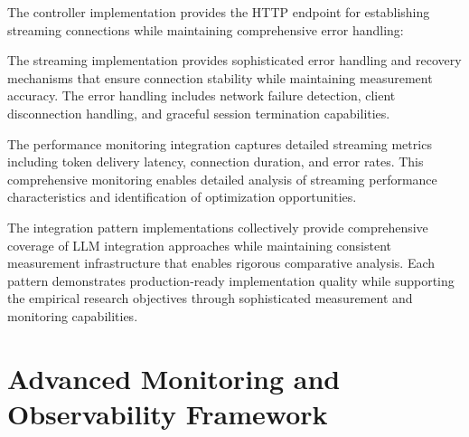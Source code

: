 
The controller implementation provides the HTTP endpoint for establishing streaming connections while maintaining comprehensive error handling:



The streaming implementation provides sophisticated error handling and recovery mechanisms that ensure connection stability while maintaining measurement accuracy. The error handling includes network failure detection, client disconnection handling, and graceful session termination capabilities.

The performance monitoring integration captures detailed streaming metrics including token delivery latency, connection duration, and error rates. This comprehensive monitoring enables detailed analysis of streaming performance characteristics and identification of optimization opportunities.


The integration pattern implementations collectively provide comprehensive coverage of LLM integration approaches while maintaining consistent measurement infrastructure that enables rigorous comparative analysis. Each pattern demonstrates production-ready implementation quality while supporting the empirical research objectives through sophisticated measurement and monitoring capabilities.

\chapter{Advanced Monitoring and Observability Framework}

